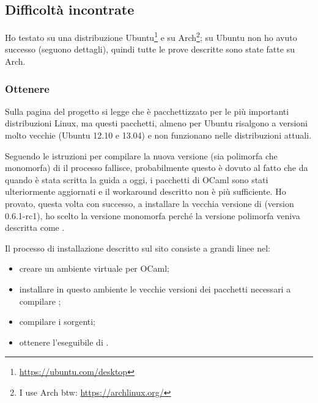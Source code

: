 \subsection{Difficoltà incontrate}
Ho testato \cduce su una distribuzione Ubuntu\footnote{\url{https://ubuntu.com/desktop}} e su Arch\footnote{I use Arch btw: \url{https://archlinux.org/}}; su Ubuntu non ho avuto successo (seguono dettagli), quindi tutte le prove descritte sono state fatte su Arch.
\subsubsection{Ottenere \cduce}\label{cduce_install}
Sulla pagina del progetto si legge che \cduce è pacchettizzato per le più importanti distribuzioni Linux, ma questi pacchetti, almeno per Ubuntu risalgono a versioni molto vecchie (Ubuntu 12.10 e 13.04) e non funzionano nelle distribuzioni attuali.

Seguendo le istruzioni per compilare la nuova versione (sia polimorfa che monomorfa) di \cduce il processo fallisce, probabilmente questo è dovuto al fatto che da quando è stata scritta la guida a oggi, i pacchetti di OCaml sono stati ulteriormente aggiornati e il workaround descritto non è più sufficiente. Ho provato, questa volta con successo, a installare la vecchia versione di \cduce (version 0.6.1-rc1), ho scelto la versione monomorfa perché la versione polimorfa veniva descritta come .

Il processo di installazione descritto sul sito consiste a grandi linee nel:
\begin{itemize}
	\item creare un ambiente virtuale per OCaml;
	\item installare in questo ambiente le vecchie versioni dei pacchetti necessari a compilare \cduce;
	\item compilare i sorgenti;
	\item ottenere l'eseguibile di \cduce.
\end{itemize}
